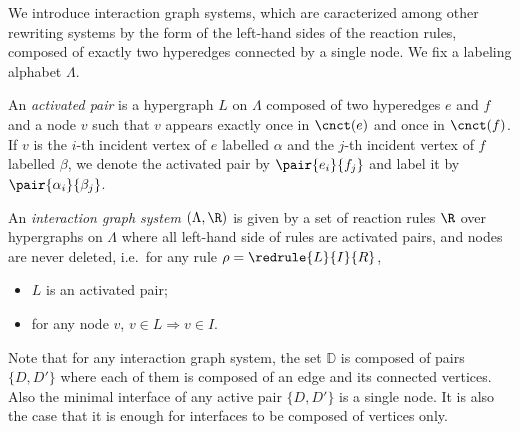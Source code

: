 We introduce interaction graph systems, 
which are caracterized among other rewriting systems by the form of the left-hand sides of the reaction rules, 
composed of exactly two hyperedges connected by a single node.
We fix a labeling alphabet $\Lambda$.
\begin{definition}
  An \emph{activated pair} is a hypergraph $L$ on $\Lambda$ composed of two hyperedges $e$ and $f$ and a node  $v$ such that $v$ appears exactly once in $\cnct(e)$ and once in $\cnct(f)$.
  If $v$ is the $i$-th incident vertex of $e$ labelled $\alpha$ and the $j$-th incident vertex of $f$ labelled $\beta$, we denote the activated pair by $\pair{e_i}{f_j}$ and label it by $\pair{\alpha_i}{\beta_j}$.

  An \emph{interaction graph system} $(\Lambda,\R)$ is given by a set of reaction rules $\R$ over hypergraphs on $\Lambda$ 
  where all left-hand side of rules are activated pairs, 
  and  nodes are never deleted, 
  i.e.\ for any rule $\rho = \redrule{L}{I}{R}$, 
  \begin{itemize}
    \item $L$ is an activated pair;
    \item for any node $v$, $v \in L \Rightarrow v \in I$.
  \end{itemize}
  \label{def:interSys}
\end{definition}
Note that for any interaction graph system, 
the set $\mathbb D$ is composed of pairs $\{D,D'\}$ where each of them is composed of an edge and its connected vertices.
Also the minimal interface of any active pair $\{D,D'\}$ is a single node.
It is also the case that it is enough for interfaces to be composed of vertices only.




